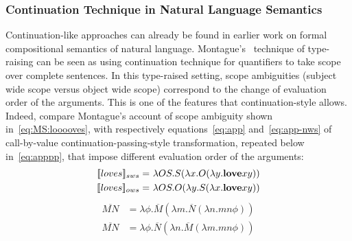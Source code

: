 \subsubsection{Continuation Technique in Natural Language Semantics} \label{subsubsec:ContinuationInNLSemantics}


Continuation-like approaches can already be found in earlier work on formal compositional semantics of natural language. Montague's~\cite{Montague:1973:The-Proper-Treatment-of-Quantification-in-Ordinary-English} technique of type-raising can be seen as using continuation technique for quantifiers to take scope over complete sentences. In this type-raised setting, scope ambiguities (subject wide scope versus object wide scope) correspond to the change of evaluation order of the arguments. This is one of the features that continuation-style allows. Indeed, compare Montague's account of scope ambiguity shown in~\eqref{eq:MS:looooves}, with respectively equations~\eqref{eq:app} and~\eqref{eq:app-nws} of call-by-value continuation-passing-style transformation, repeated below in~\eqref{eq:apppp}, that impose different evaluation order of the arguments:
%
\begin{subequations}
\begin{align}
\I{loves}_{sws} = \ & \lambda OS. S (\lambda x. O (\lambda y. \textbf{love} x y) ) \\
\I{loves}_{ows} = \ & \lambda OS. O (\lambda y. S (\lambda x. \textbf{love} x y) )
\end{align}
\label{eq:MS:looooves}
\end{subequations}
%
\begin{subequations}
\begin{align}
\overline{MN} & = \lambda \phi. \overline{M}(\lambda m. \overline{N}(\lambda n.mn \phi)) \\
\overline{MN} & = \lambda \phi. \overline{N}(\lambda n. \overline{M}(\lambda m.mn \phi)) 
\end{align}
\label{eq:apppp}
\end{subequations}


